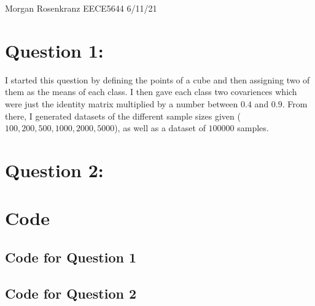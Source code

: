 \documentclass[11pt]{article}
\begin{document}
Morgan Rosenkranz 
EECE5644 
6/11/21 

\section*{Question 1:}

I started this question by defining the points of a cube and then assigning two of them as the means of each class.
I then gave each class two covariences which were just the identity matrix multiplied by a number between $0.4$ and $0.9$.
From there, I generated datasets of the different sample sizes given ($100,200,500,1000,2000,5000$), as well as a dataset of $100000$ samples.


\section*{Question 2:}


\section*{Code}
\subsection*{Code for Question 1}


\subsection*{Code for Question 2}

\end{document}
